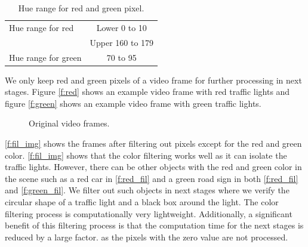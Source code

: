 \begin{table}[h!]
  \centering
  \caption{Hue range for red and green pixel.}
  \label{t:hue_range}
  \begin{tabular}{  l | c  }
    \hline
    Hue range for red & Lower 0 to 10 \\ \cline{2-2}
    & Upper 160 to 179 \\
    \hline \hline
    Hue range for green & 70 to 95 \\
    \hline
  \end{tabular}
\end{table}


We only keep red and green pixels of a video frame for further processing in next stages.
Figure \ref{f:red} shows an example video frame with red traffic lights and figure \ref{f:green} shows an example video frame with green traffic lights.

\begin{figure}[!ht]
\centering
{}
\hfill
{}
\caption{Original video frames.}
\label{f:org_img}
\end{figure}


\ref{f:fil_img} shows the frames after filtering out pixels except for the red and green color. 
\ref{f:fil_img} shows that the color filtering works well as it can isolate the traffic lights. 
However, there can be other objects with the red and green color in the scene such as a red car in \ref{f:red_fil} and a green road sign in both \ref{f:red_fil} and \ref{f:green_fil}.
We filter out such objects in next stages where we verify the circular shape of a traffic light and a black box around the light.
The color filtering process is computationally very lightweight.
Additionally, a significant benefit of this filtering process is that the computation time for the next stages is reduced by a large factor.
as the pixels with the zero value are not processed.


